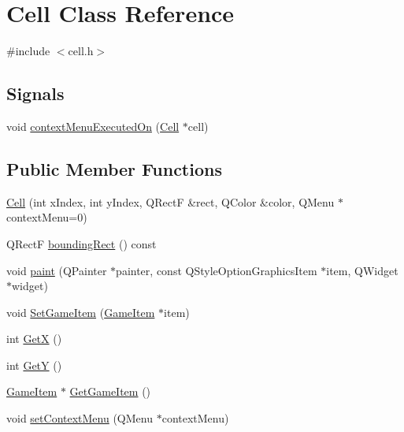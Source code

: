 \hypertarget{class_cell}{
\section{Cell Class Reference}
\label{class_cell}
}


{\ttfamily \#include $<$cell.h$>$}

\subsection*{Signals}
\begin{DoxyCompactItemize}
\item 
void \hyperlink{class_cell_a2d4b967aabd621d694ddbed0b90eed00}{contextMenuExecutedOn} (\hyperlink{class_cell}{Cell} $\ast$cell)
\end{DoxyCompactItemize}
\subsection*{Public Member Functions}
\begin{DoxyCompactItemize}
\item 
\hyperlink{class_cell_a508dbd3fd5b3b988ae2405063f787f98}{Cell} (int xIndex, int yIndex, QRectF \&rect, QColor \&color, QMenu $\ast$contextMenu=0)
\item 
QRectF \hyperlink{class_cell_ae5b2ec915956734b2ebcccb73c3f98e8}{boundingRect} () const 
\item 
void \hyperlink{class_cell_afcbe495223f91b760fb93fa17aac991a}{paint} (QPainter $\ast$painter, const QStyleOptionGraphicsItem $\ast$item, QWidget $\ast$widget)
\item 
void \hyperlink{class_cell_a2229f507e3ce9265ddbb724caecebbb8}{SetGameItem} (\hyperlink{class_game_item}{GameItem} $\ast$item)
\item 
int \hyperlink{class_cell_a91e44d6a6b1b4ac59babaec3cb99ea66}{GetX} ()
\item 
int \hyperlink{class_cell_a67badd925fbe193a1a29557c1917e00f}{GetY} ()
\item 
\hyperlink{class_game_item}{GameItem} $\ast$ \hyperlink{class_cell_a089646fb36ac094bb1d0b91bc01e3f7f}{GetGameItem} ()
\item 
void \hyperlink{class_cell_a1b75b6f17d7fa5ed7557207e85bdd3f6}{setContextMenu} (QMenu $\ast$contextMenu)
\end{DoxyCompactItemize}
